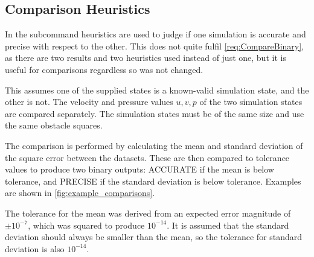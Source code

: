 \subsection{Comparison Heuristics}\label{sec:Comparisons}
In the  subcommand heuristics are used to judge if one simulation is accurate and precise with respect to the other.
This does not quite fulfil \cref{req:CompareBinary}, as there are two results and two heuristics used instead of just one, but it is useful for comparisons regardless so was not changed.

This assumes one of the supplied states is a known-valid simulation state, and the other is not.
The velocity and pressure values $u, v, p$ of the two simulation states are compared separately.
The simulation states must be of the same size and use the same obstacle squares.

The comparison is performed by calculating the mean and standard deviation of the square error between the datasets.
These are then compared to tolerance values to produce two binary outputs: ACCURATE if the mean is below tolerance, and PRECISE if the standard deviation is below tolerance.
Examples are shown in \cref{fig:example_comparisons}.

The tolerance for the mean was derived from an expected error magnitude of $\pm 10^{-7}$, which was squared to produce $10^{-14}$.
It is assumed that the standard deviation should always be smaller than the mean, so the tolerance for standard deviation is also $10^{-14}$.

